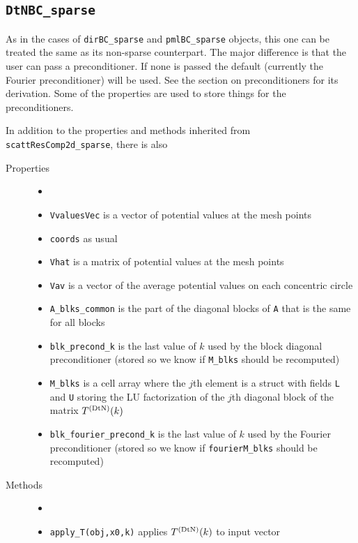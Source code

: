 \subsection{{\tt DtNBC\_sparse}}
\label{sec-DtNBC_sparse}

As in the cases of {\tt dirBC\_sparse} and {\tt pmlBC\_sparse}
objects, this one can be treated the same as its non-sparse counterpart.
The major difference is that the user can pass a preconditioner. If none
is passed the default (currently the Fourier preconditioner) will be used. 
See the section on preconditioners for its derivation.
Some of the properties are used to store things for the preconditioners.

In addition to the properties and methods inherited from
{\tt scattResComp2d\_sparse}, there is also
\begin{description}
 \item[Properties]
   \begin{itemize}
    \item[]
    \item {\tt VvaluesVec} is a vector of potential values at the mesh points
    \item {\tt coords} as usual
    \item {\tt Vhat} is a matrix of potential values at the mesh points
    \item {\tt Vav} is a vector of the average potential values on each 
          concentric circle
    \item {\tt A\_blks\_common} is the part of the diagonal blocks of {\tt A}
          that is the same for all blocks
    \item {\tt blk\_precond\_k} is the last value of $k$ used by the 
          block diagonal preconditioner
          (stored so we know if {\tt M\_blks} should be recomputed)
    \item {\tt M\_blks} is a cell array where the $j$th element is a struct
          with fields {\tt L} and {\tt U} storing the LU factorization of
          the $j$th diagonal block of the matrix $T^{(\text{DtN})}(k)$
    \item {\tt blk\_fourier\_precond\_k} is the last value of $k$ used
          by the Fourier preconditioner (stored so we know if
          {\tt fourierM\_blks} should be recomputed)
   \end{itemize}
 \item[Methods]
   \begin{itemize}
    \item[]
    \item {\tt apply\_T(obj,x0,k)} applies $T^{(\text{DtN})}(k)$ to input vector

\end{itemize}
\end{description}
